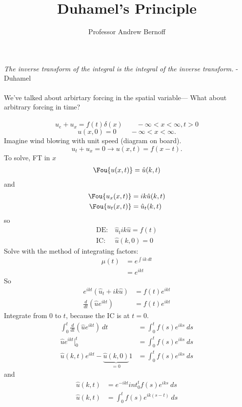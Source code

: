 \documentclass[cm]{article}
\title{Duhamel's Principle}
\author{Professor Andrew Bernoff}
\newcommand{\uhat}{\hat{u}}
\begin{document}
\maketitle
{\it The inverse transform of the integral is the integral of the inverse
    transform.} - Duhamel\\~\\

We've talked about arbirtary forcing in the spatial variable--- What about
arbitrary forcing in time?
\\~\\
\ex
$$u_e + u_x = f(t) \delta(x) \qquad - \infty < x < \infty, t > 0$$
$$u(x,0) = 0 \qquad -\infty < x < \infty.$$
Imagine wind blowing with unit speed (diagram on board).
$$u_t + u_x = 0 \longrightarrow u(x,t) = f(x - t).$$
To solve, FT in $x$
\begin{align*}
\Fou \{u(x,t)\} = \uhat(k,t)
\end{align*}
and
\begin{align*}
\Fou \{u_x(x,t)\} &= ik\uhat(k,t) \\
\Fou \{u_t(x,t)\} &= \uhat_t(k,t)
\end{align*}
so
\begin{align*}
\text{DE:}&~ \uhat_t ik\uhat = f(t) \\
\text{IC:}&~ \uhat(k,0) = 0
\end{align*}
Solve with the method of integrating factors:
\begin{align*}
\mu(t) &= e^{\int ik~dt} \\
          &= e^{ikt}
\end{align*}
So
\begin{align*}
e^{ikt}(\uhat_t + ik\uhat) &= f(t)e^{ikt} \\
\frac{d}{dt}(\uhat e^{ikt}) &= f(t) e^{ikt}
\end{align*}
Integrate from $0$ to $t$, because the IC is at $t=0$.
\begin{align*}
\int_0^t \frac{d}{dt} (\uhat e^{ikt})~dt &= \int_0^t f(s) e^{iks}~ds \\
        \uhat e^{ikt} \Big[_0^t &= \int_0^t f(s) e^{iks}~ds \\
        \uhat(k,t)e^{ikt} - \underbrace{\uhat(k,0)}_{=0}1 &= \int_0^t f(s)
        e^{iks}~ds
\end{align*}
and
\begin{align*}
\uhat(k,t) &= e^{-ikt} int_0^t f(s) e^{iks}~ds \\
\uhat(k,t) &= \int_0^t f(s) e^{ik(s-t)}~ds
\end{align*}
\end{document}

